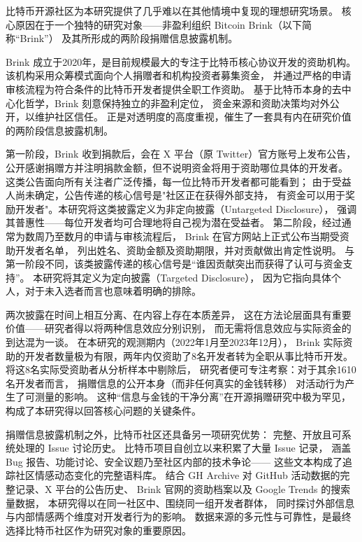 比特币开源社区为本研究提供了几乎难以在其他情境中复现的理想研究场景。
核心原因在于一个独特的研究对象——非盈利组织 Bitcoin Brink（以下简称“Brink”）
及其所形成的两阶段捐赠信息披露机制。

Brink 成立于2020年，是目前规模最大的专注于比特币核心协议开发的资助机构。
该机构采用众筹模式面向个人捐赠者和机构投资者募集资金，
并通过严格的申请审核流程为符合条件的比特币开发者提供全职工作资助。
基于比特币本身的去中心化哲学，Brink 刻意保持独立的非盈利定位，
资金来源和资助决策均对外公开，以维护社区信任。
正是对透明度的高度重视，催生了一套具有内在研究价值的两阶段信息披露机制。

第一阶段，Brink 收到捐款后，会在 X 平台（原 Twitter）官方账号上发布公告，
公开感谢捐赠方并注明捐款金额，但不说明资金将用于资助哪位具体的开发者。
这类公告面向所有关注者广泛传播，每一位比特币开发者都可能看到；
由于受益人尚未确定，公告传递的核心信号是"社区正在获得外部支持，
有资金可以用于奖励开发者"。本研究将这类披露定义为非定向披露（Untargeted Disclosure），
强调其普惠性——每位开发者均可合理地将自己视为潜在受益者。
第二阶段，经过通常为数周乃至数月的申请与审核流程后，
Brink 在官方网站上正式公布当期受资助开发者名单，
列出姓名、资助金额及资助期限，并对贡献做出肯定性说明。
与第一阶段不同，该类披露传递的核心信号是“谁因贡献突出而获得了认可与资金支持”。
本研究将其定义为定向披露（Targeted Disclosure），
因为它指向具体个人，对于未入选者而言也意味着明确的排除。

两次披露在时间上相互分离、在内容上存在本质差异，
这在方法论层面具有重要价值——研究者得以将两种信息效应分别识别，
而无需将信息效应与实际资金的到达混为一谈。
在本研究的观测期内（2022年1月至2023年12月），
Brink 实际资助的开发者数量极为有限，两年内仅资助了8名开发者转为全职从事比特币开发。
将这8名实际受资助者从分析样本中剔除后，
研究者便可专注考察：对于其余1610名开发者而言，
捐赠信息的公开本身（而非任何真实的金钱转移）
对活动行为产生了可测量的影响。
这种“信息与金钱的干净分离”在开源捐赠研究中极为罕见，
构成了本研究得以回答核心问题的关键条件。

捐赠信息披露机制之外，比特币社区还具备另一项研究优势：
完整、开放且可系统处理的 Issue 讨论历史。
比特币项目自创立以来积累了大量 Issue 记录，
涵盖 Bug 报告、功能讨论、安全议题乃至社区内部的技术争论——
这些文本构成了追踪社区情感动态变化的完整语料库。
结合 GH Archive 对 GitHub 活动数据的完整记录、X 平台的公告历史、
Brink 官网的资助档案以及 Google Trends 的搜索量数据，
本研究得以在同一社区中、围绕同一组开发者群体，
同时探讨外部信息与内部情感两个维度对开发者行为的影响。
数据来源的多元性与可靠性，是最终选择比特币社区作为研究对象的重要原因。

